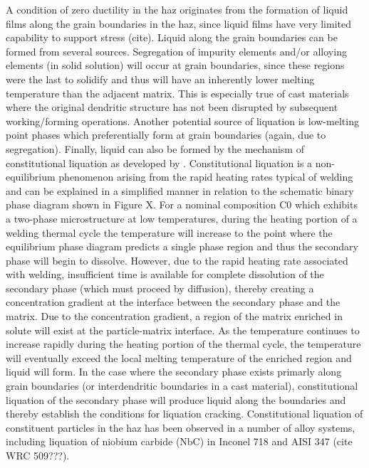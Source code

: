 A condition of zero ductility in the \gls{haz} originates from the formation of liquid films along the grain boundaries in the \gls{haz}, since liquid films have very limited capability to support stress (cite). Liquid along the grain boundaries can be formed from several sources. Segregation of impurity elements and/or alloying elements (in solid solution) will occur at grain boundaries, since these regions were the last to solidify and thus will have an inherently lower melting temperature than the adjacent matrix. This is especially true of cast materials where the original dendritic structure has not been disrupted by subsequent working/forming operations. Another potential source of liquation is low-melting point phases which preferentially form at grain boundaries (again, due to segregation). Finally, liquid can also be formed by the mechanism of constitutional liquation as developed by \citet{pepe_effects_1967}. Constitutional liquation is a non-equilibrium phenomenon arising from the rapid heating rates typical of welding and can be explained in a simplified manner in relation to the schematic binary phase diagram shown in Figure X. For a nominal composition C0 which exhibits a two-phase microstructure at low temperatures, during the heating portion of a welding thermal cycle the temperature will increase to the point where the equilibrium phase diagram predicts a single phase region and thus the secondary phase will begin to dissolve. However, due to the rapid heating rate associated with welding, insufficient time is available for complete dissolution of the secondary phase (which must proceed by diffusion), thereby creating a concentration gradient at the interface between the secondary phase and the matrix. Due to the concentration gradient, a region of the matrix enriched in solute will exist at the particle-matrix interface. As the temperature continues to increase rapidly during the heating portion of the thermal cycle, the temperature will eventually exceed the local melting temperature of the enriched region and liquid will form. In the case where the secondary phase exists primarly along grain boundaries (or interdendritic boundaries in a cast material), constitutional liquation of the secondary phase will produce liquid along the boundaries and thereby establish the conditions for liquation cracking. Constitutional liquation of constituent particles in the \gls{haz} has been observed in a number of alloy systems, including liquation of niobium carbide (NbC) in Inconel 718 \cite{radhakrishnan_phase_1991} and AISI 347 (cite WRC 509???).


